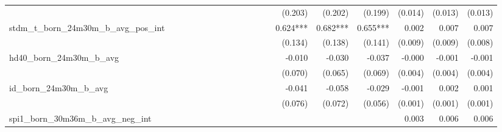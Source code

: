 \begin{tabular}{lrrrrrrrrrrrrrrrrrr}
                                            &              &              &              &              &              &              &              &              &               &              &              &               &      (0.203) &      (0.202) &       (0.199) &      (0.014) &      (0.013) &       (0.013) \\ 
stdm\_t\_born\_24m30m\_b\_avg\_pos\_int     &              &              &              &              &              &              &              &              &               &              &              &               &     0.624*** &     0.682*** &      0.655*** &        0.002 &        0.007 &         0.007 \\ 
                                            &              &              &              &              &              &              &              &              &               &              &              &               &      (0.134) &      (0.138) &       (0.141) &      (0.009) &      (0.009) &       (0.008) \\ 
hd40\_born\_24m30m\_b\_avg                  &              &              &              &              &              &              &              &              &               &              &              &               &       -0.010 &       -0.030 &        -0.037 &       -0.000 &       -0.001 &        -0.001 \\ 
                                            &              &              &              &              &              &              &              &              &               &              &              &               &      (0.070) &      (0.065) &       (0.069) &      (0.004) &      (0.004) &       (0.004) \\ 
id\_born\_24m30m\_b\_avg                    &              &              &              &              &              &              &              &              &               &              &              &               &       -0.041 &       -0.058 &        -0.029 &       -0.001 &        0.002 &         0.001 \\ 
                                            &              &              &              &              &              &              &              &              &               &              &              &               &      (0.076) &      (0.072) &       (0.056) &      (0.001) &      (0.001) &       (0.001) \\ 
spi1\_born\_30m36m\_b\_avg\_neg\_int        &              &              &              &              &              &              &              &              &               &              &              &               &              &              &               &        0.003 &        0.006 &         0.006 \\ 

\end{tabular}
